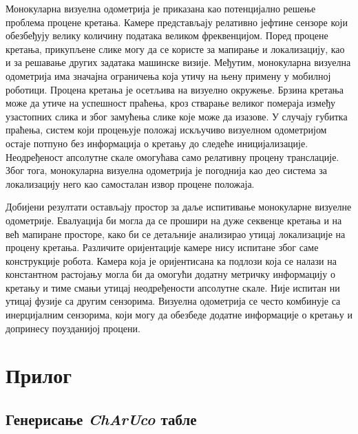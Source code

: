 \documentclass[12pt]{article}
\begin{document}
Монокуларна визуелна одометрија је приказана као потенцијално решење проблема
процене кретања. Камере представљају релативно јефтине сензоре који обезбеђују
велику количину података великом фреквенцијом. Поред процене кретања,
прикупљене слике могу да се користе за мапирање и локализацију, као и за
решавање других задатака машинске визије. Међутим, монокуларна визуелна
одометрија има значајна ограничења која утичу на њену примену у мобилној
роботици. Процена кретања је осетљива на визуелно окружење. Брзина кретања може
да утиче на успешност праћења, кроз стварање великог помераја између узастопних
слика и због замућења слике које може да изазове. У случају губитка праћења,
систем који процењује положај искључиво визуелном одометријом остаје потпуно
без информација о кретању до следеће иницијализације. Неодређеност апсолутне
скале омогућава само релативну процену транслације. Због тога, монокуларна
визуелна одометрија је погоднија као део система за локализацију него као
самосталан извор процене положаја.

Добијени резултати остављају простор за даље испитивање монокуларне визуелне
одометрије. Евалуација би могла да се прошири на дуже секвенце кретања и на већ
мапиране просторе, како би се детаљније анализирао утицај локализације на
процену кретања. Различите оријентације камере нису испитане због саме
конструкције робота. Камера која је оријентисана ка подлози која се налази на
константном растојању могла би да омогући додатну метричку информацију о
кретању и тиме смањи утицај неодређености апсолутне скале. Није испитан ни
утицај фузије са другим сензорима. Визуелна одометрија се често комбинује са
инерцијалним сензорима, који могу да обезбеде додатне информације о кретању и
допринесу поузданијој процени.

\newpage

\printbibliography


\section*{Прилог}

\begingroup

\fontsize{8}{9}\selectfont

\subsection*{Генерисање \textit{ChArUco} табле}
\end{document}
